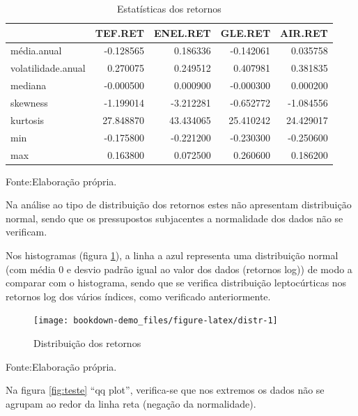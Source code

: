 \documentclass[
  12pt,
  a4paper,
  openany]{book}
\begin{document}
\normalsize

\begin{table}[!h]

\caption{\label{tab:statret}Estatísticas dos retornos}
\centering
\begin{tabular}[t]{lrrrr}
\toprule
  & TEF.RET & ENEL.RET & GLE.RET & AIR.RET\\
\midrule
média.anual & -0.128565 & 0.186336 & -0.142061 & 0.035758\\
volatilidade.anual & 0.270075 & 0.249512 & 0.407981 & 0.381835\\
mediana & -0.000500 & 0.000900 & -0.000300 & 0.000200\\
skewness & -1.199014 & -3.212281 & -0.652772 & -1.084556\\
kurtosis & 27.848870 & 43.434065 & 25.410242 & 24.429017\\
\addlinespace
min & -0.175800 & -0.221200 & -0.230300 & -0.250600\\
max & 0.163800 & 0.072500 & 0.260600 & 0.186200\\
\bottomrule
\end{tabular}
\end{table}
\FloatBarrier
\centering

Fonte:Elaboração própria.

\justifying
\bigskip

Na análise ao tipo de distribuição dos retornos estes não apresentam distribuição normal, sendo que os pressupostos subjacentes a normalidade dos dados não se verificam.

Nos histogramas (figura \ref{fig:distr}), a linha a azul representa uma distribuição normal (com média 0 e desvio padrão igual ao valor dos dados (retornos log)) de modo a comparar com o histograma, sendo que se verifica distribuição leptocúrticas nos retornos log dos vários índices, como verificado anteriormente.

\begin{figure}

{\centering \texttt{[image: bookdown-demo\_files/figure-latex/distr-1]} 

}

\caption{Distribuição dos retornos}\label{fig:distr}
\end{figure}
\FloatBarrier
\centering

Fonte:Elaboração própria.

\justifying

Na figura \ref{fig:teste} ``qq plot'', verifica-se que nos extremos os dados não se agrupam ao redor da linha reta (negação da normalidade).
\end{document}
